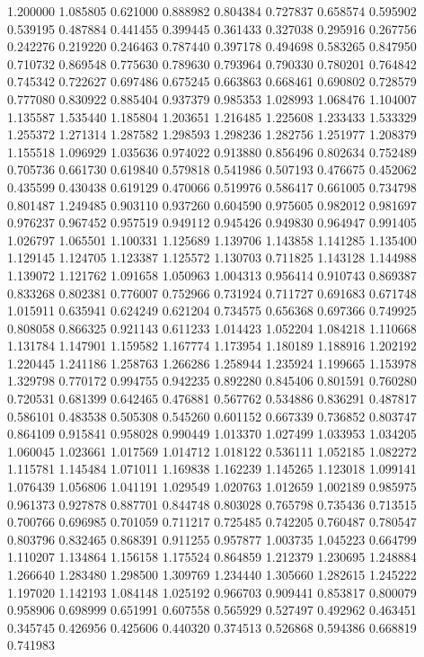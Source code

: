 1.200000
1.085805
0.621000
0.888982
0.804384
0.727837
0.658574
0.595902
0.539195
0.487884
0.441455
0.399445
0.361433
0.327038
0.295916
0.267756
0.242276
0.219220
0.246463
0.787440
0.397178
0.494698
0.583265
0.847950
0.710732
0.869548
0.775630
0.789630
0.793964
0.790330
0.780201
0.764842
0.745342
0.722627
0.697486
0.675245
0.663863
0.668461
0.690802
0.728579
0.777080
0.830922
0.885404
0.937379
0.985353
1.028993
1.068476
1.104007
1.135587
1.535440
1.185804
1.203651
1.216485
1.225608
1.233433
1.533329
1.255372
1.271314
1.287582
1.298593
1.298236
1.282756
1.251977
1.208379
1.155518
1.096929
1.035636
0.974022
0.913880
0.856496
0.802634
0.752489
0.705736
0.661730
0.619840
0.579818
0.541986
0.507193
0.476675
0.452062
0.435599
0.430438
0.619129
0.470066
0.519976
0.586417
0.661005
0.734798
0.801487
1.249485
0.903110
0.937260
0.604590
0.975605
0.982012
0.981697
0.976237
0.967452
0.957519
0.949112
0.945426
0.949830
0.964947
0.991405
1.026797
1.065501
1.100331
1.125689
1.139706
1.143858
1.141285
1.135400
1.129145
1.124705
1.123387
1.125572
1.130703
0.711825
1.143128
1.144988
1.139072
1.121762
1.091658
1.050963
1.004313
0.956414
0.910743
0.869387
0.833268
0.802381
0.776007
0.752966
0.731924
0.711727
0.691683
0.671748
1.015911
0.635941
0.624249
0.621204
0.734575
0.656368
0.697366
0.749925
0.808058
0.866325
0.921143
0.611233
1.014423
1.052204
1.084218
1.110668
1.131784
1.147901
1.159582
1.167774
1.173954
1.180189
1.188916
1.202192
1.220445
1.241186
1.258763
1.266286
1.258944
1.235924
1.199665
1.153978
1.329798
0.770172
0.994755
0.942235
0.892280
0.845406
0.801591
0.760280
0.720531
0.681399
0.642465
0.476881
0.567762
0.534886
0.836291
0.487817
0.586101
0.483538
0.505308
0.545260
0.601152
0.667339
0.736852
0.803747
0.864109
0.915841
0.958028
0.990449
1.013370
1.027499
1.033953
1.034205
1.060045
1.023661
1.017569
1.014712
1.018122
0.536111
1.052185
1.082272
1.115781
1.145484
1.071011
1.169838
1.162239
1.145265
1.123018
1.099141
1.076439
1.056806
1.041191
1.029549
1.020763
1.012659
1.002189
0.985975
0.961373
0.927878
0.887701
0.844748
0.803028
0.765798
0.735436
0.713515
0.700766
0.696985
0.701059
0.711217
0.725485
0.742205
0.760487
0.780547
0.803796
0.832465
0.868391
0.911255
0.957877
1.003735
1.045223
0.664799
1.110207
1.134864
1.156158
1.175524
0.864859
1.212379
1.230695
1.248884
1.266640
1.283480
1.298500
1.309769
1.234440
1.305660
1.282615
1.245222
1.197020
1.142193
1.084148
1.025192
0.966703
0.909441
0.853817
0.800079
0.958906
0.698999
0.651991
0.607558
0.565929
0.527497
0.492962
0.463451
0.345745
0.426956
0.425606
0.440320
0.374513
0.526868
0.594386
0.668819
0.741983
